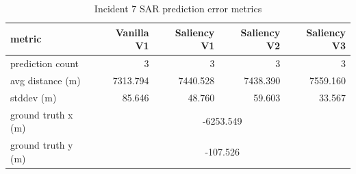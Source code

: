 \begin{table}[ht]
\centering
\caption{Incident 7 SAR prediction error metrics}
\label{tab:sar-incident-7}
\begin{tabular}{lrrrr}
\hline
metric & Vanilla V1 & Saliency V1 & Saliency V2 & Saliency V3 \\
\hline
prediction count & 3 & 3 & 3 & 3 \\
avg distance (m) & 7313.794 & 7440.528 & 7438.390 & 7559.160 \\
stddev (m) & 85.646 & 48.760 & 59.603 & 33.567 \\
ground truth x (m) & \multicolumn{4}{c}{-6253.549} \\
ground truth y (m) & \multicolumn{4}{c}{-107.526} \\
\hline
\end{tabular}
\end{table}
